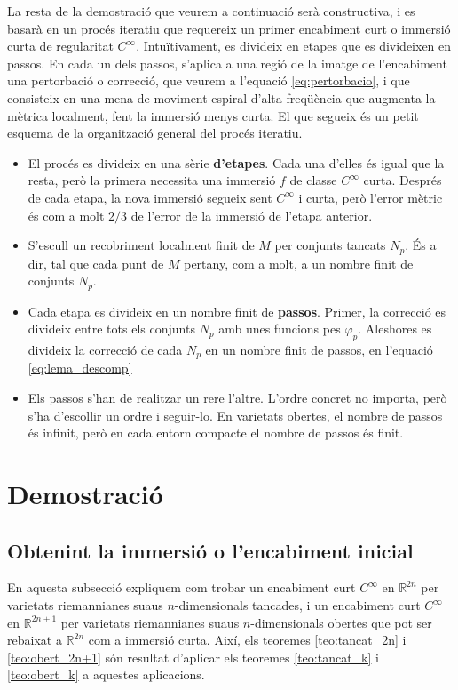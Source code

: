 La resta de la demostració que veurem a continuació serà constructiva, i es basarà en un procés iteratiu que requereix un primer encabiment curt o immersió curta de regularitat $C^\infty$. Intuïtivament, es divideix en etapes que es divideixen en passos. En cada un dels passos, s'aplica a una regió de la imatge de l'encabiment una pertorbació o correcció, que veurem a l'equació \eqref{eq:pertorbacio}, i que consisteix en una mena de moviment espiral d'alta freqüència que augmenta la mètrica localment, fent la immersió menys curta. El que segueix és un petit esquema de la organització general del procés iteratiu.

\begin{itemize}
    \item El procés es divideix en una sèrie \textbf{d'etapes}. Cada una d'elles és igual que la resta, però la primera necessita una immersió $f$ de classe $C^\infty$ curta. Després de cada etapa, la nova immersió segueix sent $C^\infty$ i curta, però l'error mètric és com a molt $2/3$ de l'error de la immersió de l'etapa anterior.
    \item S'escull un recobriment localment finit de $M$ per conjunts tancats $N_p$. És a dir, tal que cada punt de $M$ pertany, com a molt, a un nombre finit de conjunts $N_p$.
    \item Cada etapa es divideix en un nombre finit de \textbf{passos}. Primer, la correcció es divideix entre tots els conjunts $N_p$ amb unes funcions pes $\varphi_p$. Aleshores es divideix la correcció de cada $N_p$ en un nombre finit de passos, en l'equació \eqref{eq:lema_descomp}
    \item Els passos s'han de realitzar un rere l'altre. L'ordre concret no importa, però s'ha d'escollir un ordre i seguir-lo. En varietats obertes, el nombre de passos és infinit, però en cada entorn compacte el nombre de passos és finit.
\end{itemize}

\section{Demostració}
\subsection{Obtenint la immersió o l'encabiment inicial}\label{sec:encabiment_inicial}
En aquesta subsecció expliquem com trobar un encabiment curt $C^\infty$ en $\mathbb R^{2n}$ per varietats riemannianes suaus $n$-dimensionals tancades, i un encabiment curt $C^\infty$ en $\mathbb R^{2n+1}$ per varietats riemannianes suaus $n$-dimensionals obertes que pot ser rebaixat a $\mathbb R^{2n}$ com a immersió curta. Així, els teoremes \ref{teo:tancat_2n} i \ref{teo:obert_2n+1} són resultat d'aplicar els teoremes \ref{teo:tancat_k} i \ref{teo:obert_k} a aquestes aplicacions.

